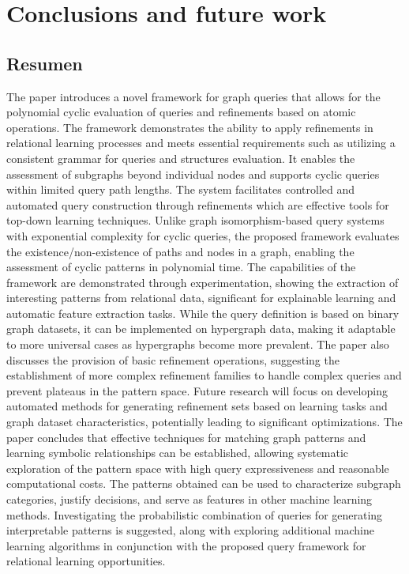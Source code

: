 \documentclass{article}%
\begin{document}
%
\section{Conclusions and future work}%
\label{sec:Conclusionsandfuturework}%
\subsection{Resumen}%
\label{subsec:Resumen}%
The paper introduces a novel framework for graph queries that allows for the polynomial cyclic evaluation of queries and refinements based on atomic operations. The framework demonstrates the ability to apply refinements in relational learning processes and meets essential requirements such as utilizing a consistent grammar for queries and structures evaluation. It enables the assessment of subgraphs beyond individual nodes and supports cyclic queries within limited query path lengths. The system facilitates controlled and automated query construction through refinements which are effective tools for top{-}down learning techniques.\newline%
\newline%
Unlike graph isomorphism{-}based query systems with exponential complexity for cyclic queries, the proposed framework evaluates the existence/non{-}existence of paths and nodes in a graph, enabling the assessment of cyclic patterns in polynomial time. The capabilities of the framework are demonstrated through experimentation, showing the extraction of interesting patterns from relational data, significant for explainable learning and automatic feature extraction tasks.\newline%
\newline%
While the query definition is based on binary graph datasets, it can be implemented on hypergraph data, making it adaptable to more universal cases as hypergraphs become more prevalent. The paper also discusses the provision of basic refinement operations, suggesting the establishment of more complex refinement families to handle complex queries and prevent plateaus in the pattern space. Future research will focus on developing automated methods for generating refinement sets based on learning tasks and graph dataset characteristics, potentially leading to significant optimizations.\newline%
\newline%
The paper concludes that effective techniques for matching graph patterns and learning symbolic relationships can be established, allowing systematic exploration of the pattern space with high query expressiveness and reasonable computational costs. The patterns obtained can be used to characterize subgraph categories, justify decisions, and serve as features in other machine learning methods. Investigating the probabilistic combination of queries for generating interpretable patterns is suggested, along with exploring additional machine learning algorithms in conjunction with the proposed query framework for relational learning opportunities.
\end{document}

